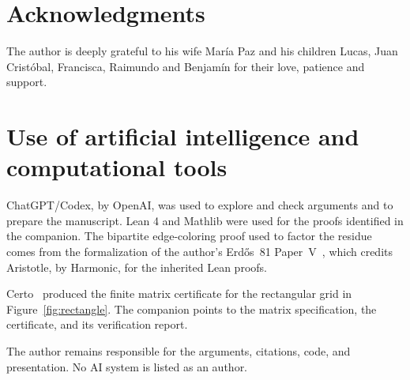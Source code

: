 \documentclass[11pt]{article}
\begin{document}
\section*{Acknowledgments}

The author is deeply grateful to his wife María Paz and his children Lucas, Juan Cristóbal, Francisca, Raimundo and Benjamín for their love, patience and support.

\section*{Use of artificial intelligence and computational tools}

ChatGPT/Codex, by OpenAI, was used to explore and check arguments and to prepare the manuscript. Lean 4 and Mathlib were used for the proofs identified in the companion. The bipartite edge-coloring proof used to factor the residue comes from the formalization of the author's Erdős~81 Paper~V~\cite{TraversoV}, which credits Aristotle, by Harmonic, for the inherited Lean proofs.

Certo~\cite{Certo} produced the finite matrix certificate for the rectangular grid in Figure~\ref{fig:rectangle}. The companion points to the matrix specification, the certificate, and its verification report.

The author remains responsible for the arguments, citations, code, and presentation. No AI system is listed as an author.
\end{document}
